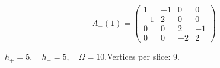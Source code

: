 \begin{minipage}{\linewidth}
\begin{minipage}[c]{0.495\linewidth}
\end{minipage}%
\begin{minipage}[c]{0.495\linewidth}\centering\fontsize{9.7}{12}\selectfont
\setlength{\abovedisplayskip}{4pt}\setlength{\belowdisplayskip}{4pt}
\setlength{\abovedisplayshortskip}{4pt}\setlength{\belowdisplayshortskip}{4pt}
\setlength{\arraycolsep}{3pt}\renewcommand{\arraystretch}{1.08}
\[A_{-}(1)=\begin{pmatrix}1 & -1 & 0 & 0\\-1 & 2 & 0 & 0\\0 & 0 & 2 & -1\\0 & 0 & -2 & 2\end{pmatrix}\]
\end{minipage}%
\par\smallskip\noindent\small $h_+=5,\quad h_-=5,\quad \Omega=10.$\quad Vertices per slice: 9.
\end{minipage}\par\vfill
